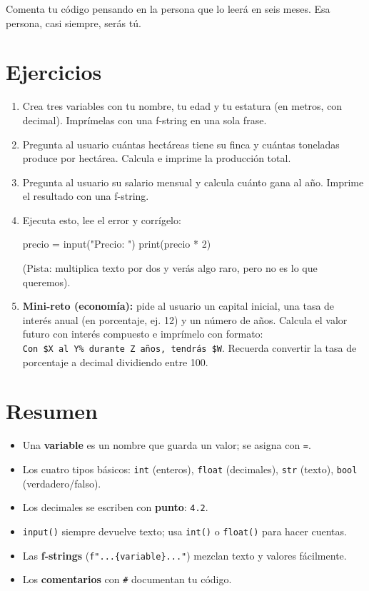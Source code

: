 \documentclass[
  spanish,
  letterpaper,
  DIV=11,
  numbers=noendperiod]{scrreprt}
\newenvironment{Shaded}{\begin{snugshade}}{\end{snugshade}}
\newcommand{\BuiltInTok}[1]{\textcolor[rgb]{0.00,0.23,0.31}{#1}}
\newcommand{\DecValTok}[1]{\textcolor[rgb]{0.68,0.00,0.00}{#1}}
\newcommand{\NormalTok}[1]{\textcolor[rgb]{0.00,0.23,0.31}{#1}}
\newcommand{\OperatorTok}[1]{\textcolor[rgb]{0.37,0.37,0.37}{#1}}
\newcommand{\StringTok}[1]{\textcolor[rgb]{0.13,0.47,0.30}{#1}}
\providecommand{\tightlist}{%
  \setlength{\itemsep}{0pt}\setlength{\parskip}{0pt}}
\begin{document}
Comenta tu código pensando en la persona que lo leerá en seis meses. Esa
persona, casi siempre, serás tú.

\section{Ejercicios}\label{ejercicios-1}

\begin{enumerate}
\def\labelenumi{\arabic{enumi}.}
\item
  Crea tres variables con tu nombre, tu edad y tu estatura (en metros,
  con decimal). Imprímelas con una f-string en una sola frase.
\item
  Pregunta al usuario cuántas hectáreas tiene su finca y cuántas
  toneladas produce por hectárea. Calcula e imprime la producción total.
\item
  Pregunta al usuario su salario mensual y calcula cuánto gana al año.
  Imprime el resultado con una f-string.
\item
  Ejecuta esto, lee el error y corrígelo:

\begin{Shaded}
\begin{Highlighting}[]
\NormalTok{precio }\OperatorTok{=} \BuiltInTok{input}\NormalTok{(}\StringTok{"Precio: "}\NormalTok{)}
\BuiltInTok{print}\NormalTok{(precio }\OperatorTok{*} \DecValTok{2}\NormalTok{)}
\end{Highlighting}
\end{Shaded}

  (Pista: multiplica texto por dos y verás algo raro, pero no es lo que
  queremos).
\item
  \textbf{Mini-reto (economía):} pide al usuario un capital inicial, una
  tasa de interés anual (en porcentaje, ej. 12) y un número de años.
  Calcula el valor futuro con interés compuesto e imprímelo con formato:
  \texttt{Con\ \$X\ al\ Y\%\ durante\ Z\ años,\ tendrás\ \$W}. Recuerda
  convertir la tasa de porcentaje a decimal dividiendo entre 100.
\end{enumerate}

\section{Resumen}\label{resumen-1}

\begin{itemize}
\tightlist
\item
  Una \textbf{variable} es un nombre que guarda un valor; se asigna con
  \texttt{=}.
\item
  Los cuatro tipos básicos: \texttt{int} (enteros), \texttt{float}
  (decimales), \texttt{str} (texto), \texttt{bool} (verdadero/falso).
\item
  Los decimales se escriben con \textbf{punto}: \texttt{4.2}.
\item
  \texttt{input()} siempre devuelve texto; usa \texttt{int()} o
  \texttt{float()} para hacer cuentas.
\item
  Las \textbf{f-strings} (\texttt{f"...\{variable\}..."}) mezclan texto
  y valores fácilmente.
\item
  Los \textbf{comentarios} con \texttt{\#} documentan tu código.
\end{itemize}
\end{document}
